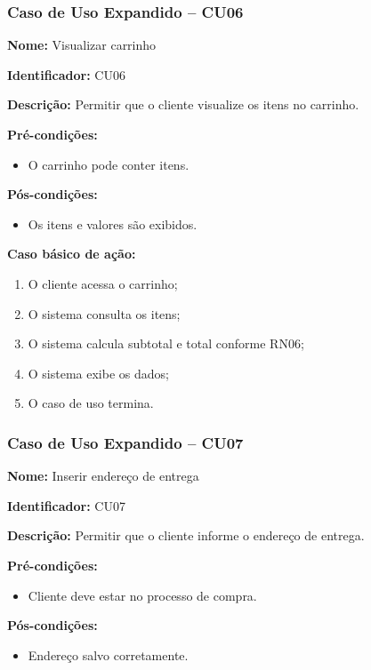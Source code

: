 \documentclass[12pt]{article}
\begin{document}

\subsubsection{Caso de Uso Expandido -- CU06}

\textbf{Nome:} Visualizar carrinho

\textbf{Identificador:} CU06

\textbf{Descrição:} Permitir que o cliente visualize os itens no carrinho.

\textbf{Pré-condições:}
\begin{itemize}
\item O carrinho pode conter itens.
\end{itemize}

\textbf{Pós-condições:}
\begin{itemize}
\item Os itens e valores são exibidos.
\end{itemize}

\textbf{Caso básico de ação:}
\begin{enumerate}
\item O cliente acessa o carrinho;
\item O sistema consulta os itens;
\item O sistema calcula subtotal e total conforme RN06;
\item O sistema exibe os dados;
\item O caso de uso termina.
\end{enumerate}



\subsubsection{Caso de Uso Expandido -- CU07}

\textbf{Nome:} Inserir endereço de entrega

\textbf{Identificador:} CU07

\textbf{Descrição:} Permitir que o cliente informe o endereço de entrega.

\textbf{Pré-condições:}
\begin{itemize}
\item Cliente deve estar no processo de compra.
\end{itemize}

\textbf{Pós-condições:}
\begin{itemize}
\item Endereço salvo corretamente.
\end{itemize}
\end{document}
